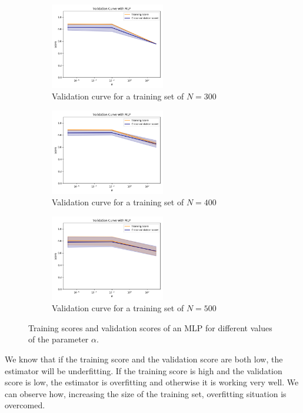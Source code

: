 \documentclass[12pt,letterpaper]{article}
\begin{document}
\begin{figure}[H]
    \begin{subfigure}{0.3\textwidth}
    \includegraphics[width=5cm]{images/validationcurve_300.jpg} 
    \caption{Validation curve for a training set of $N=300$}
    \label{fig:subfig5}
    \end{subfigure}
    \begin{subfigure}{0.3\textwidth}
    \includegraphics[width=5cm]{images/validationcurve_400.jpg}
    \caption{Validation curve for a training set of $N=400$}
    \label{fig:subfiig6}
    \end{subfigure}
    \begin{subfigure}{0.3\textwidth}
    \includegraphics[width=5cm]{images/validationcurve_500.jpg}
    \caption{Validation curve for a training set of $N=500$}
    \label{fig:subfiig7}
    \end{subfigure}
    \caption{Training scores and validation scores of an MLP for different values of the parameter $\alpha$.}
\end{figure}

We know that if the training score and the validation score are both low, the estimator will be underfitting. If the training score is high and the validation score is low, the estimator is overfitting and otherwise it is working very well. We can observe how, increasing the size of the training set, overfitting situation is overcomed. 
\end{document}
